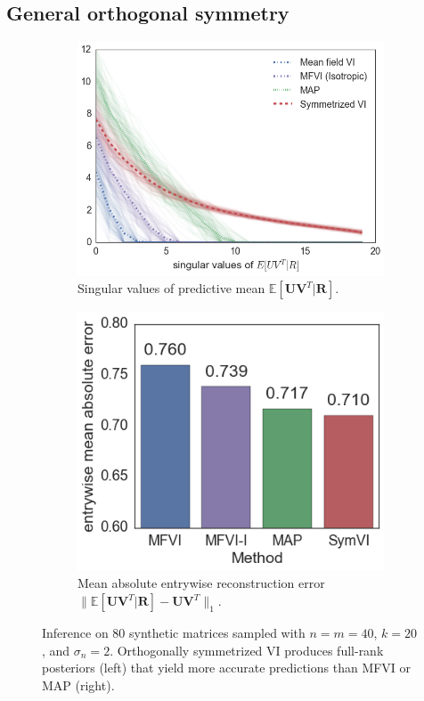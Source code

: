 \documentclass{article}
\newcommand{\E}{\mathbb{E}}
\renewcommand{\v}[1]{\mathbf{#1}}
\begin{document}
\subsection{General orthogonal symmetry}
\begin{figure}[t]
\centering
\begin{subfigure}[t]{.5\textwidth}
\includegraphics[width=\textwidth]{rot_sv_plot}
\caption{Singular values of predictive mean $\E[\v{U}\v{V}^T |
  \v{R}]$. }
\label{fig:rot_svs}
\end{subfigure}
\begin{subfigure}[t]{.45\textwidth}
\includegraphics[width=\textwidth]{rot_error_barplot}
\caption{Mean absolute entrywise reconstruction error $\|\E[\v{U}\v{V}^T | \v{R}] - \v{U}\v{V}^T
  \|_1$.}
\label{fig:rot_error}
\end{subfigure}
\caption{Inference on 80 synthetic matrices sampled with $n=m=40$, $k=20$, and $\sigma_n
  = 2$. Orthogonally symmetrized VI produces full-rank
  posteriors (left) that yield more accurate predictions than MFVI or
  MAP (right).}
\end{figure}
\end{document}
